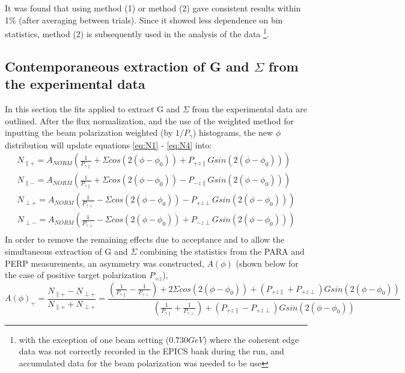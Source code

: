 It was found that using method (1) or method (2) gave consistent results within 1\% (after averaging between trials). Since it showed less dependence on bin statistics, method (2) is subsequently used in the analysis of the data \footnote{with the exception of one beam setting ($0.730 GeV$) where the coherent edge data was not correctly recorded in the EPICS bank during the run, and accumulated data for the beam polarization was needed to be use}.



\subsection{Contemporaneous extraction of G and \texorpdfstring{$\Sigma$}{Sigma} from the experimental data} \label{ch:extract_G_S}
In this section the fits applied to extract G and $\Sigma$ from the experimental data are outlined.  After the flux normalization, and the use of the weighted method for inputting the beam polarization weighted (by $1/P_{\gamma}$) histograms, the new $\phi$ distribution will update equations \ref{eq:N1} - \ref{eq:N4} into:
\begin{eqnarray}
N_{\parallel +} = A_{NORM} \left( \frac{1}{P_{\gamma \parallel}} + \Sigma cos(2(\phi-\phi_0)) +  P_{+z\parallel} G sin(2(\phi-\phi_0)) \right) \label{eq:UN1}\\
N_{\parallel -} = A_{NORM} \left(\frac{1}{P_{\gamma \parallel}} + \Sigma cos(2(\phi-\phi_0)) - P_{-z\parallel} G sin(2(\phi-\phi_0)) \right) \label{eq:UN2}\\
N_{\perp +} = A_{NORM} \left( \frac{1}{P_{\gamma \perp}} - \Sigma cos(2(\phi-\phi_0)) -  P_{+z\perp} G sin(2(\phi-\phi_0)) \right) \label{eq:UN3}\\
N_{\perp -} = A_{NORM} \left( \frac{1}{P_{\gamma \perp}} - \Sigma cos(2(\phi-\phi_0)) +  P_{-z\perp} G sin(2(\phi-\phi_0)) \right) \label{eq:UN4}\\
\end{eqnarray}
In order to remove the remaining effects due to acceptance and to allow the simultaneous extraction of G and $\Sigma$ combining the statistics from the PARA and PERP measurements, an asymmetry was constructed, $A(\phi)$ (shown below for the case of positive target polarization $P_{+z}$),
\begin{equation}
  A(\phi)_+ = \frac{N_{\parallel +} - N_{\perp +}}{N_{\parallel +} + N_{\perp +}} = \frac{ (\frac{1}{P_{\gamma \parallel}} - \frac{1}{P_{\gamma \perp}}) + 2 \Sigma cos(2(\phi-\phi_0)) +  (P_{+z\parallel}+P_{+z\perp}) G sin(2(\phi-\phi_0))}{(\frac{1}{P_{\gamma \parallel}} + \frac{1}{P_{\gamma \perp}}) +(P_{+z\parallel}-P_{+z\perp}) G sin(2(\phi-\phi_0))} \label{eq:A1}
\end{equation}
